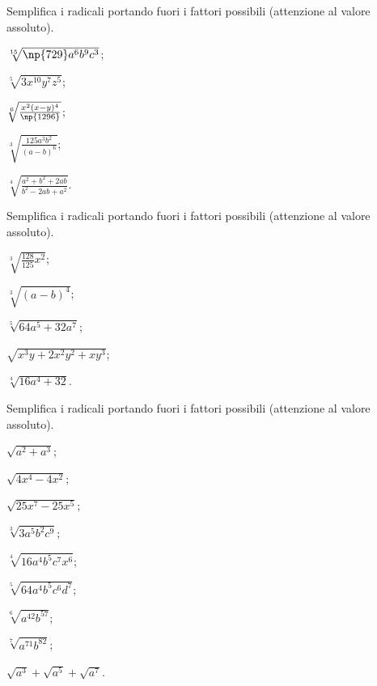 \begin{esercizio}[\Ast]
 \label{ese:2.56}
Semplifica i radicali portando fuori i fattori possibili (attenzione al valore assoluto).
 \begin{multicols}{3}
 \begin{enumeratea}
 \item $\sqrt[15]{\np{729}a^{6}b^{9}c^{3}}$;
 \item $\sqrt[5]{3x^{10}y^{7}z^{5}}$;
 \item $\sqrt[6]{\frac{x^{2}(x-y)^{4}}{\np{1296}}}$;
 \item $\sqrt[3]{\frac{125a^{3}b^{2}}{(a-b)^6}}$;
 \item $\sqrt[4]{\frac{a^{2}+b^{2}+2ab}{b^{2}-2ab+a^{2}}}$.
 \end{enumeratea}
 \end{multicols}
\end{esercizio}

\begin{esercizio}[\Ast]
 \label{ese:2.57}
Semplifica i radicali portando fuori i fattori possibili (attenzione al valore assoluto).
 \begin{multicols}{3}
 \begin{enumeratea}
 \item $\sqrt[3]{\frac{128}{125}x^{2}}$;
 \item $\sqrt[3]{(a-b)^{4}}$;
 \item $\sqrt[5]{64a^{5}+32a^{7}}$;
 \item $\sqrt{x^{3}y+2x^{2}y^{2}+xy^{3}}$;
 \item $\sqrt[4]{16a^{4}+32}$.
 \end{enumeratea}
 \end{multicols}
\end{esercizio}

\begin{esercizio}[\Ast]
 \label{ese:2.58}
Semplifica i radicali portando fuori i fattori possibili (attenzione al valore assoluto).
 \begin{multicols}{3}
 \begin{enumeratea}
 \item $\sqrt{a^2+a^3}$;
 \item $\sqrt{4x^4-4x^2}$;
 \item $\sqrt{25x^7-25x^5}$;
 \item $\sqrt[3]{3a^5b^2c^9}$;
 \item $\sqrt[4]{16a^4b^5c^7x^6}$;
 \item $\sqrt[5]{64a^4b^5c^6d^7}$;
 \item $\sqrt[6]{a^{42}b^{57}}$;
 \item $\sqrt[7]{a^{71}b^{82}}$;
 \item $\sqrt{a^3}+\sqrt{a^5}+\sqrt{a^7}$.
 \end{enumeratea}
 \end{multicols}
\end{esercizio}

